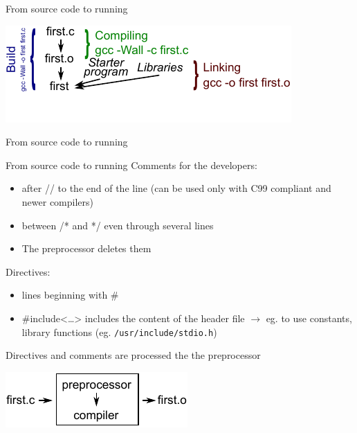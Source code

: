 \documentclass[usenames,dvipsnames,aspectratio=169]{beamer}
\newcommand{\kiemel}[1]{{\color{kiemelesszin}#1}}
\begin{document}
\begin{frame}{From source code to running}
  \begin{center}
    \includegraphics[width=\textwidth]{process.pdf}
  \end{center}
\end{frame}

\begin{frame}{From source code to running}
  \begin{exampleblock}{}
    \footnotesize
    
  \end{exampleblock}
\end{frame}

\begin{frame}{From source code to running}
  Comments for the developers:
  \begin{itemize}
    \item after \kiemel{//} to the end of the line (can be used only with C99 compliant and newer compilers)
    \item between \kiemel{/*} and \kiemel{*/} even through several lines
    \item The preprocessor deletes them
  \end{itemize}
  Directives:
  \begin{itemize}
    \item lines beginning with \kiemel{\#}
    \item \kiemel{\#include<\dots>} includes the content of the header file $\to$ eg. to use constants, library functions (eg. \texttt{/usr/include/stdio.h})
  \end{itemize}
  Directives and comments are processed the the preprocessor
  \begin{center}
    \includegraphics{preproc.pdf}
  \end{center}
\end{frame}
\end{document}
